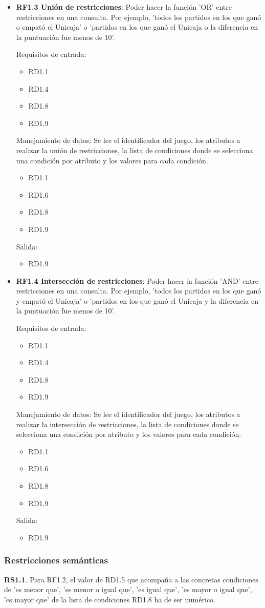 \begin{itemize}
	
	\item \textbf{RF1.3 Unión de restricciones}: Poder hacer la función 'OR' entre restricciones en una consulta. Por ejemplo, 'todos los partidos en los que ganó o empató el Unicaja' o 'partidos en los que ganó el Unicaja o la diferencia en la puntuación fue menos de 10'.
	
	Requisitos de entrada:
	\begin{itemize}
		\item RD1.1
		\item RD1.4
		\item RD1.8
		\item RD1.9
	\end{itemize}
	Manejamiento de datos: Se lee el identificador del juego, los atributos a realizar la unión de restricciones, la lista de condiciones donde se selecciona una condición por atributo y los valores para cada condición.
	\begin{itemize}
		\item RD1.1
		\item RD1.6
		\item RD1.8
		\item RD1.9
	\end{itemize}
	Salida:
	\begin{itemize}
		\item RD1.9
	\end{itemize}
	
	
	\item \textbf{RF1.4 Intersección de restricciones}: Poder hacer la función 'AND' entre restricciones en una consulta. Por ejemplo, 'todos los partidos en los que ganó y empató el Unicaja' o 'partidos en los que ganó el Unicaja y la diferencia en la puntuación fue menos de 10'.
	
	Requisitos de entrada:
	\begin{itemize}
		\item RD1.1
		\item RD1.4
		\item RD1.8
		\item RD1.9
	\end{itemize}
	Manejamiento de datos: Se lee el identificador del juego, los atributos a realizar la intersección de restricciones, la lista de condiciones donde se selecciona una condición por atributo y los valores para cada condición.
	\begin{itemize}
		\item RD1.1
		\item RD1.6
		\item RD1.8
		\item RD1.9
	\end{itemize}
	Salida:
	\begin{itemize}
		\item RD1.9
	\end{itemize}
\end{itemize}




\subsubsection{Restricciones semánticas}

\textbf{RS1.1}. Para RF1.2, el valor de RD1.5 que acompaña a las concretas condiciones de 'es menor que', 'es menor o igual que', 'es igual que', 'es mayor o igual que', 'es mayor que' de la lista de condiciones RD1.8 ha de ser numérico.